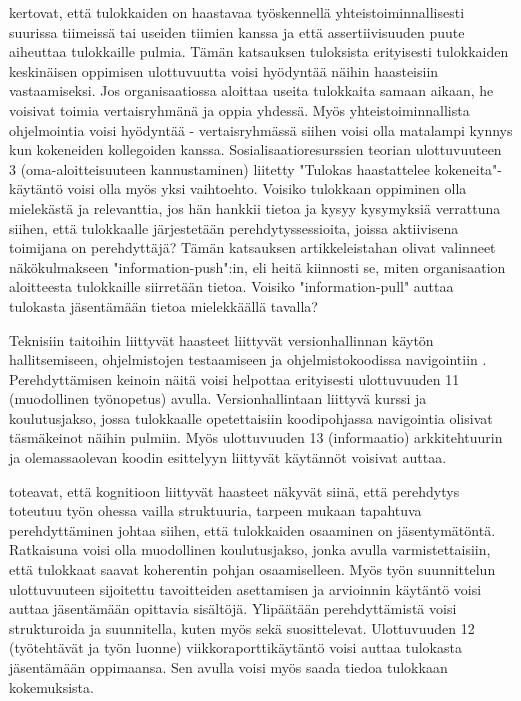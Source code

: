 \documentclass[utf8]{gradu3}
\begin{document}
\textcite{begel-simon-2008} kertovat, että tulokkaiden on haastavaa työskennellä yhteistoiminnallisesti suurissa tiimeissä tai useiden tiimien kanssa ja että assertiivisuuden puute aiheuttaa tulokkaille pulmia. Tämän katsauksen tuloksista erityisesti tulokkaiden keskinäisen oppimisen ulottuvuutta voisi hyödyntää näihin haasteisiin vastaamiseksi. Jos organisaatiossa aloittaa useita tulokkaita samaan aikaan, he voisivat toimia vertaisryhmänä ja oppia yhdessä. Myös yhteistoiminnallista ohjelmointia voisi hyödyntää - vertaisryhmässä siihen voisi olla matalampi kynnys kun kokeneiden kollegoiden kanssa. Sosialisaatioresurssien teorian ulottuvuuteen 3 (oma-aloitteisuuteen kannustaminen) liitetty "Tulokas haastattelee kokeneita"-käytäntö voisi olla myös yksi vaihtoehto. Voisiko tulokkaan oppiminen olla mielekästä ja relevanttia, jos hän hankkii tietoa ja kysyy kysymyksiä verrattuna siihen, että tulokkaalle järjestetään perehdytyssessioita, joissa aktiivisena toimijana on perehdyttäjä? Tämän katsauksen artikkeleistahan \textcite{yates-ym-2020} olivat valinneet näkökulmakseen "information-push":in, eli heitä kiinnosti se, miten organisaation aloitteesta tulokkaille siirretään tietoa. Voisiko "information-pull" auttaa tulokasta jäsentämään tietoa mielekkäällä tavalla?

Teknisiin taitoihin liittyvät haasteet liittyvät versionhallinnan käytön hallitsemiseen, ohjelmistojen testaamiseen ja ohjelmistokoodissa navigointiin \parencite{begel-simon-2008}. Perehdyttämisen keinoin näitä voisi helpottaa erityisesti ulottuvuuden 11 (muodollinen työnopetus) avulla. Versionhallintaan liittyvä kurssi ja koulutusjakso, jossa tulokkaalle opetettaisiin koodipohjassa navigointia olisivat täsmäkeinot näihin pulmiin. Myös ulottuvuuden 13 (informaatio) arkkitehtuurin ja olemassaolevan koodin esittelyyn liittyvät käytännöt voisivat auttaa. 

\textcite{begel-simon-2008} toteavat, että kognitioon liittyvät haasteet näkyvät siinä, että perehdytys toteutuu työn ohessa vailla struktuuria, tarpeen mukaan tapahtuva perehdyttäminen johtaa siihen, että tulokkaiden osaaminen on jäsentymätöntä. Ratkaisuna voisi olla muodollinen koulutusjakso, jonka avulla varmistettaisiin, että tulokkaat saavat koherentin pohjan osaamiselleen. Myös työn suunnittelun ulottuvuuteen sijoitettu tavoitteiden asettamisen ja arvioinnin käytäntö voisi auttaa jäsentämään opittavia sisältöjä. Ylipäätään perehdyttämistä voisi strukturoida ja suunnitella, kuten myös \textcite{britto-ym-2020} sekä \textcite{hemphill-begel-2011} suosittelevat. Ulottuvuuden 12 (työtehtävät ja työn luonne) viikkoraporttikäytäntö voisi auttaa tulokasta jäsentämään oppimaansa. Sen avulla voisi myös saada tiedoa tulokkaan kokemuksista.
\end{document}
